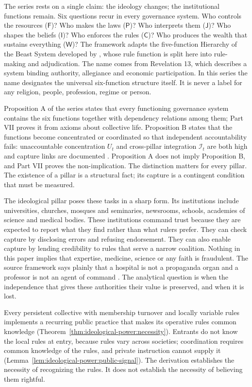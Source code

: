 \documentclass[11pt,letterpaper]{article}
\theoremstyle{definition}
\theoremstyle{remark}
\newcommand{\pF}{\mathsf{F}}
\newcommand{\pP}{\mathsf{P}}
\newcommand{\pJ}{\mathsf{J}}
\newcommand{\pI}{\mathsf{I}}
\newcommand{\pC}{\mathsf{C}}
\newcommand{\pW}{\mathsf{W}}
\newcommand{\Int}{\mathcal{I}}
\begin{document}
The series rests on a single claim: the ideology changes; the institutional functions remain. Six questions recur in every governance system. Who controls the resources ($\pF$)? Who makes the laws ($\pP$)? Who interprets them ($\pJ$)? Who shapes the beliefs ($\pI$)? Who enforces the rules ($\pC$)? Who produces the wealth that sustains everything ($\pW$)? The framework adapts the five-function Hierarchy of the Beast System developed by \citet{largo2026hbs}, whose rule function is split here into rule-making and adjudication. The name comes from Revelation 13, which describes a system binding authority, allegiance and economic participation. In this series the name designates the universal six-function structure itself. It is never a label for any religion, people, profession, regime or person.

Proposition A of the series states that every functioning governance system contains the six functions together with dependency relations among them; Part VII proves it from axioms about collective life. Proposition B states that the functions become concentrated or coordinated so that independent accountability fails: unaccountable concentration $U_t$ and cross-pillar integration $\Int_t$ are both high and capture links are documented \citep{largo2026hbs}. Proposition A does not imply Proposition B, and Part VII proves the non-implication. The distinction matters for every pillar. The existence of a pillar is a structural fact; its capture is a contingent condition that must be measured.

The ideological pillar poses these tasks in a sharp form. Its institutions include universities, churches, mosques and seminaries, newsrooms, schools, academies of science and medical bodies. These institutions command trust because they are expected to report what they find rather than what rulers prefer. They can check capture by disclosing errors and refusing endorsement. They can also enable capture by lending credibility to rules that serve a narrow coalition. Nothing in this paper implies that expertise, medicine, science or any faith is fraudulent. The source framework says plainly that a hospital is not a propaganda organ and a professor is not an agent of command \citep{largo2026hbs}. The analytical question is when the independence that gives these authorities their value is preserved, and when it is lost.

Every persistent collective with membership turnover and locally variable rules implements a recurring public practice that makes its operative rules common knowledge (Theorem~\ref{thm:ideological-power:necessity}). Entrants do not know the local rules at entry, because rules vary across societies; coordination requires common knowledge of the rules, and private instruction cannot supply it (Lemma~\ref{lem:ideological-power:public-signal}). The derivation establishes the necessity of recognizing the rules. It does not establish the necessity of believing them rightful.
\end{document}
